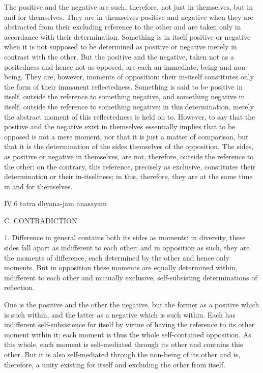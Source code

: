 The positive and the negative are such, therefore,
not just in themselves, but in and for themselves.
They are in themselves positive and negative
when they are abstracted from their excluding
reference to the other
and are taken only in accordance
with their determination.
Something is in itself positive or negative
when it is not supposed to be
determined as positive or negative
merely in contrast with the other.
But the positive and the negative,
taken not as a positedness
and hence not as opposed,
are each an immediate,
being and non-being.
They are, however, moments of opposition:
their in-itself constitutes only
the form of their immanent reflectedness.
Something is said to be positive in itself,
outside the reference to something negative,
and something negative in itself,
outside the reference to something negative:
in this determination, merely the abstract moment of
this reflectedness is held on to.
However, to say that the positive and the negative
exist in themselves essentially implies that
to be opposed is not a mere moment,
nor that it is just a matter of comparison,
but that it is the determination of the sides
themselves of the opposition.
The sides, as positive or negative in themselves,
are not, therefore, outside the reference to the other;
on the contrary, this reference, precisely as exclusive,
constitutes their determination or their in-itselfness;
in this, therefore, they are at the same time
in and for themselves.

IV.6
tatra dhyana-jam anasayam

C. CONTRADICTION

1. Difference in general contains both its sides as moments;
in diversity, these sides fall apart as indifferent to each other;
and in opposition as such, they are the moments of difference,
each determined by the other and hence only moments.
But in opposition these moments are equally determined within,
indifferent to each other and mutually exclusive,
self-subsisting determinations of reflection.

One is the positive and the other the negative,
but the former as a positive which is such within,
and the latter as a negative which is such within.
Each has indifferent self-subsistence for itself
by virtue of having the reference to
its other moment within it;
each moment is thus the whole self-contained opposition.
As this whole, each moment is self-mediated
through its other and contains this other.
But it is also self-mediated
through the non-being of its other
and is, therefore, a unity existing for itself
and excluding the other from itself.

